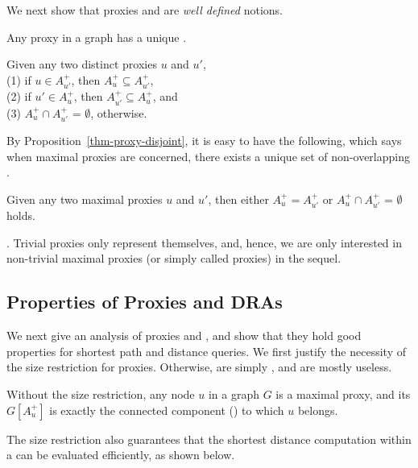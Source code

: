 We next show that proxies and \dras are {\em well defined} notions.


\begin{prop}
\label{prop-proxy-unique-dra} Any proxy in a graph has a unique \dra.
\end{prop}


\begin{prop}
\label{thm-proxy-disjoint} Given any two distinct proxies $u$ and $u'$, \\
(1) if $u\in A^+_{u'}$, then $A^+_{u}\subseteq A^+_{u'}$, \\
(2) if $u'\in A^+_{u}$, then $A^+_{u'}\subseteq A^+_{u}$,  and \\
(3) $A^+_{u}\cap A^+_{u'}$ = $\emptyset$, otherwise.
\end{prop}


By Proposition~\ref{thm-proxy-disjoint}, it is easy to have the following, which says when maximal proxies are concerned, there exists a unique set of non-overlapping \dras.

\begin{cor}
\label{cor-proxy-disjoint} Given any two maximal proxies $u$ and $u'$, then either $A^+_{u} = A^+_{u'}$ or $A^+_{u}\cap A^+_{u'}$ = $\emptyset$ holds.
\end{cor}

\vspace{-1ex}
. Trivial proxies only represent themselves, and, hence, we are only interested in non-trivial maximal proxies (or simply called proxies) in the sequel.


\subsection{Properties of Proxies and DRAs}
\label{subsec-proxy-properties}

We next give an analysis of proxies and \dras, and show that they hold good properties for shortest path and distance queries.
%
We first justify the necessity of the size restriction for proxies.  Otherwise, \dras are simply \ccs, and are mostly useless.


\begin{prop}
\label{prop-proxy-cc} Without the size restriction, any node $u$ in a graph $G$ is a maximal proxy,
and its \dra $G[A^+_u]$ is exactly the connected component (\cc) to which $u$ belongs.
\end{prop}


The size restriction also guarantees that the shortest distance computation within a \dra can be evaluated efficiently,
as shown below.


